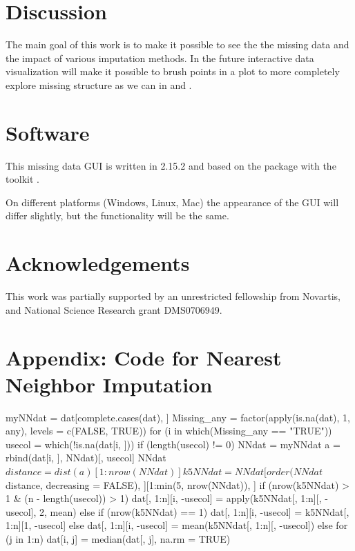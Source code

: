 \documentclass[article]{jss}
\begin{document}
\section{Discussion}

The main goal of this work is to make it possible to see the the missing data and the impact of various imputation methods. In the future interactive data visualization will make it possible to brush points in a plot to more completely explore missing structure as we can in  and .


\section*{Software}

This missing data GUI is written in  2.15.2 \citep{r} and based on the package  \citep{gwidgets} with the toolkit . 

On different platforms (Windows, Linux, Mac) the appearance of the GUI will differ slightly, but the functionality will be the same.

\section*{Acknowledgements}

This work was partially supported by an unrestricted fellowship from Novartis, and National Science Research grant DMS0706949.




\section*{Appendix: Code for Nearest Neighbor Imputation}

\begin{Code}
myNNdat = dat[complete.cases(dat), ]
Missing_any = factor(apply(is.na(dat), 1, any), levels = c(FALSE, TRUE))
for (i in which(Missing_any == "TRUE")) {
  usecol = which(!is.na(dat[i, ]))
  if (length(usecol) != 0) {
    NNdat = myNNdat
    a = rbind(dat[i, ], NNdat)[, usecol]
    NNdat$distance = dist(a)[1:nrow(NNdat)]
    k5NNdat = NNdat[order(NNdat$distance, decreasing = FALSE), ][1:min(5, 
      nrow(NNdat)), ]
    if (nrow(k5NNdat) > 1 & (n - length(usecol)) > 1) {
      dat[, 1:n][i, -usecol] = apply(k5NNdat[, 1:n][, -usecol], 2, 
        mean)
    } else {
      if (nrow(k5NNdat) == 1) {
        dat[, 1:n][i, -usecol] = k5NNdat[, 1:n][1, -usecol]
      } else {
        dat[, 1:n][i, -usecol] = mean(k5NNdat[, 1:n][, -usecol])
      }
    }
  } else {
    for (j in 1:n) {
      dat[i, j] = median(dat[, j], na.rm = TRUE)
    }
  }
}
\end{Code}
\end{document}
